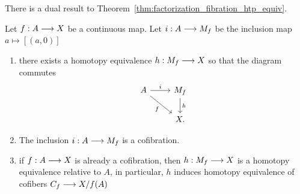 \documentclass[11pt]{book} %
\begin{document}
There is a dual result to Theorem~\ref{thm:factorization_fibration_htp_equiv}.
\begin{theorem}
Let $f: A\longrightarrow X$ be a continuous map. Let $i: A\longrightarrow M_f$ be the inclusion map $a\mapsto [(a,0)]$
\begin{enumerate}[label=(\arabic*)]
\item there exists a homotopy equivalence $h: M_f\longrightarrow X$ so that the diagram commutes
$$
\begin{tikzcd}
A \arrow[r, "i"] \arrow[rd, "f"'] & M_f \arrow[d, "h"] \\
 & X.
\end{tikzcd}
$$
\item The inclusion $i: A\longrightarrow M_f$ is a cofibration.
\item if $f: A\longrightarrow X$ is already a cofibration, then $h:M_f\longrightarrow X$ is a homotopy equivalence relative to $A$, in particular, $h$ induces homotopy equivalence of cofibers $C_f\longrightarrow X/f(A)$
\end{enumerate}
\end{theorem}
\end{document}

